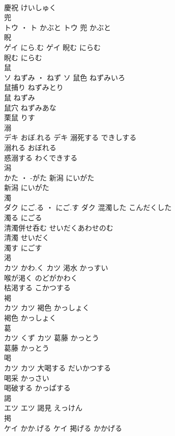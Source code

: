 \documentclass[8pt]{extreport}
\begin{document}
\begin{CJK}{UTF8}{min}
\\	慶祝	けいしゅく	
\\	兜	
\\	トウ ・ ト	かぶと	トウ													兜	かぶと	
\\	睨	
\\	ゲイ	にら.む	ゲイ	睨む	にらむ	
\\	睨む	にらむ	
\\	鼠	
\\	ソ	ねずみ ・ ねず	ソ	鼠色	ねずみいろ	
\\	鼠捕り	ねずみとり	
\\	鼠	ねずみ	
\\	鼠穴	ねずみあな	
\\	栗鼠	りす	
\\	溺	
\\	デキ	おぼ.れる	デキ	溺死する	できしする	
\\	溺れる	おぼれる	
\\	惑溺する	わくできする	
\\	潟	
\\	かた ・ -がた		新潟	にいがた	
\\	新潟	にいがた	
\\	濁	
\\	ダク	にご.る ・ にご.す	ダク	混濁した	こんだくした	
\\	濁る	にごる	
\\	清濁併せ呑む	せいだくあわせのむ	
\\	清濁	せいだく	
\\	濁す	にごす	
\\	渇	
\\	カツ	かわ.く	カツ	渇水	かっすい	
\\	喉が渇く	のどがかわく	
\\	枯渇する	こかつする	
\\	褐	
\\	カツ		カツ	褐色	かっしょく	
\\	褐色	かっしょく	
\\	葛	
\\	カツ	くず	カツ	葛藤	かっとう	
\\	葛藤	かっとう	
\\	喝	
\\	カツ		カツ	大喝する	だいかつする	
\\	喝采	かっさい	
\\	喝破する	かっぱする	
\\	謁	
\\	エツ		エツ													謁見	えっけん	
\\	掲	
\\	ケイ	かか.げる	ケイ	掲げる	かかげる	

\end{CJK}
\end{document}
